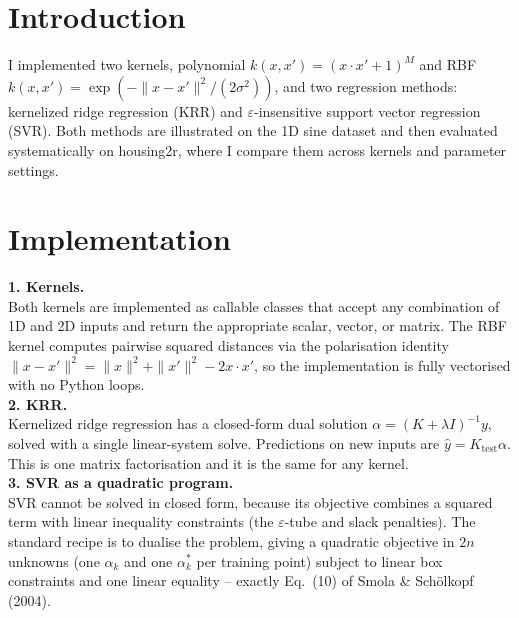 \documentclass[fleqn,moreauthors,10pt]{ds_report}
\affiliation{\textit{dn98183@student.uni-lj.si}}
\begin{document}
\flushbottom
\maketitle
\thispagestyle{empty}


\section*{Introduction}
I implemented two kernels, polynomial $k(x,x')=(x\cdot x' + 1)^M$ and RBF
$k(x,x')=\exp(-\|x-x'\|^2/(2\sigma^2))$, and two regression methods: kernelized
ridge regression (KRR) and $\varepsilon$-insensitive support vector regression
(SVR). Both methods are illustrated on the 1D sine dataset and then
evaluated systematically on housing2r, where I compare them across kernels
and parameter settings.


\section*{Implementation}

\textbf{1. Kernels.}\\
Both kernels are implemented as callable classes that accept any combination of
1D and 2D inputs and return the appropriate scalar, vector, or matrix. The RBF
kernel computes pairwise squared distances via the polarisation identity
$\|x-x'\|^2 = \|x\|^2 + \|x'\|^2 - 2x\cdot x'$, so the implementation is fully
vectorised with no Python loops.
\vspace{0.3cm}
\\
\textbf{2. KRR.}\\
Kernelized ridge regression has a closed-form dual solution
$\alpha = (K + \lambda I)^{-1}y$, solved with a single linear-system solve.
Predictions on new inputs are $\hat{y} = K_{\text{test}}\alpha$. This is one
matrix factorisation and it is the same for any kernel.
\vspace{0.3cm}
\\
\textbf{3. SVR as a quadratic program.}\\
SVR cannot be solved in closed form, because its objective combines a squared
term with linear inequality constraints (the $\varepsilon$-tube and slack
penalties). The standard recipe is to dualise the problem, giving a quadratic
objective in $2n$ unknowns (one $\alpha_k$ and one $\alpha_k^*$ per training
point) subject to linear box constraints and one linear equality -- exactly
Eq.~(10) of Smola \& Schölkopf (2004).
\end{document}
